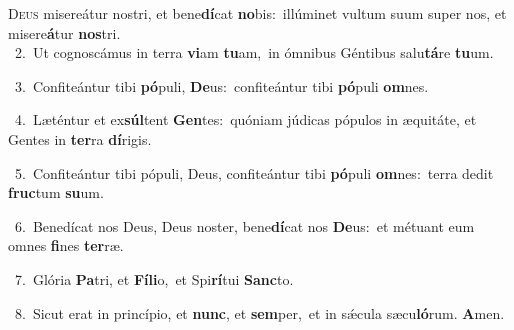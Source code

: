 \lettrine{\initial\textcolor{\initialcolor}{D}}{eus} misereátur nostri, et bene\-\textbf{dí}\-cat \textbf{no}\-bis:~\star illúminet vultum suum super nos, et misere\-\textbf{á}\-tur \textbf{nos}\-tri.\\
{\numbfont\textcolor{\numbcolor}{~2.}}~Ut cognoscámus in terra \textbf{vi}\-am \textbf{tu}\-am,~\star in ómnibus Géntibus salu\-\textbf{tá}\-re \textbf{tu}\-um.\par
{\numbfont\textcolor{\numbcolor}{~3.}}~Confiteántur tibi \textbf{pó}\-puli, \textbf{De}\-us:~\star confiteántur tibi \textbf{pó}\-puli \textbf{om}\-nes.\par
{\numbfont\textcolor{\numbcolor}{~4.}}~Læténtur et ex\-\textbf{súl}\-tent \textbf{Gen}\-tes:~\star quóniam júdicas pópulos in æquitáte, et Gentes in \textbf{ter}\-ra \textbf{dí}\-rigis.\par
{\numbfont\textcolor{\numbcolor}{~5.}}~Confiteántur tibi pópuli, Deus, confiteántur tibi \textbf{pó}\-puli \textbf{om}\-nes:~\star terra dedit \textbf{fruc}\-tum \textbf{su}\-um.\par
{\numbfont\textcolor{\numbcolor}{~6.}}~Benedícat nos Deus, Deus noster, bene\-\textbf{dí}\-cat nos \textbf{De}\-us:~\star et métuant eum omnes \textbf{fi}\-nes \textbf{ter}\-ræ.\par
{\numbfont\textcolor{\numbcolor}{~7.}}~Glória \textbf{Pa}\-tri, et \textbf{Fí}\-\textbf{li}o,~\star et Spi\-\textbf{rí}\-tui \textbf{Sanc}\-to.\par
{\numbfont\textcolor{\numbcolor}{~8.}}~Sicut erat in princípio, et \textbf{nunc}\-, et \textbf{sem}\-per,~\star et in sǽcula sæcu\-\textbf{ló}\-rum. \textbf{A}\-men.\par
